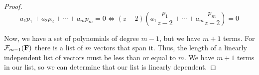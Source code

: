 \begin{enumerate}
\begin{proof}
        \[a_1p_1 + a_2p_2 + \cdots + a_mp_m = 0 \iff (z-2)(a_1\frac{p_1}{z-2} + \cdots + a_m\frac{p_m}{z-2}) = 0\]
        
        
        Now, we have a set of polynomials of degree $m - 1$, but we have $m + 1$ terms. For $\mathcal{F}_{m-1}(\bold F)$ there is a list of $m$ vectors that span it. Thus, the length of a linearly independent list of vectors must be less than or equal to $m$. We have $m + 1$ terms in our list, so we can determine that our list is linearly dependent. 
    \end{proof}



\end{enumerate}

